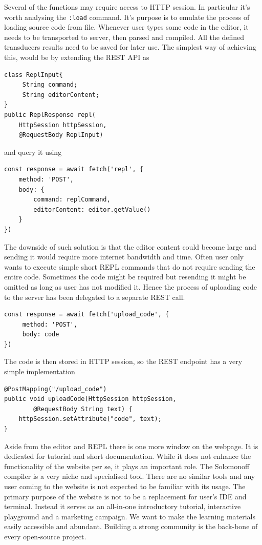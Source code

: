 Several of the functions may require access to HTTP session. In particular it's worth analysing the \texttt{:load} command. It's purpose is to emulate the process of loading source code from file. Whenever user types some code in the editor, it needs to be transported to server, then parsed and compiled. All the defined transducers results need to be saved for later use. The simplest way of achieving this, would be by extending the REST API as
\begin{lstlisting}
class ReplInput{
     String command;
     String editorContent;
}
public ReplResponse repl(
    HttpSession httpSession, 
    @RequestBody ReplInput)
\end{lstlisting}
and query it using
\begin{lstlisting}
const response = await fetch('repl', {
    method: 'POST',
    body: {
        command: replCommand,
        editorContent: editor.getValue()
    }
})
\end{lstlisting}
The downside of such solution is that the editor content could become large and sending it would require more internet bandwidth and time. Often user only wants to execute simple short REPL commands that do not require sending the entire code. Sometimes the code might be required but resending it might be omitted as long as user has not modified it. Hence the process of uploading code to the server has been delegated to a separate REST call.
\begin{lstlisting}
const response = await fetch('upload_code', {
     method: 'POST',
     body: code
})
\end{lstlisting}
The code is then stored in HTTP session, so the REST endpoint has a very simple implementation
\begin{lstlisting}
@PostMapping("/upload_code")
public void uploadCode(HttpSession httpSession, 
        @RequestBody String text) {
    httpSession.setAttribute("code", text);
}
\end{lstlisting}


Aside from the editor and REPL there is one more window on the webpage. It is dedicated for tutorial and short documentation.  While it does not enhance the functionality of the website per se, it plays an important role. The Solomonoff compiler is a very niche and specialised tool. There are no similar tools and any user coming to the website is not expected to be familiar with its usage. The primary purpose of the website is not to be a replacement for user's IDE and terminal. Instead it serves as an all-in-one introductory tutorial, interactive playground and a marketing campaign. We want to make the learning materials easily accessible and abundant. Building a strong community is the back-bone of every open-source project. 

